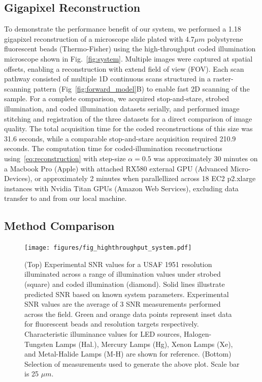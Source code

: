 \subsection{Gigapixel Reconstruction}
To demonstrate the performance benefit of our system, we performed a 1.18 gigapixel reconstruction of a microscope slide plated with 4.7$\mu m$ polystyrene fluorescent beads (Thermo-Fisher) using the high-throughput coded illumination microscope shown in Fig.~\ref{fig:system}. Multiple images were captured at spatial offsets, enabling a reconstruction with extend field of view (FOV). Each scan pathway consisted of multiple 1D continuous scans structured in a raster-scanning pattern (Fig~\ref{fig:forward_model}{B}) to enable fast 2D scanning of the sample. For a complete comparison, we acquired stop-and-stare, strobed illumination, and coded illumination datasets serially, and performed image stitching and registration of the three datasets for a direct comparison of image quality. The total acquisition time for the coded reconstructions of this size was 31.6 seconds, while a comparable stop-and-stare acquisition required 210.9 seconds. The computation time for coded-illumination reconstructions using~\eqref{eq:reconstruction} with step-size $\alpha=0.5$ was approximately 30 minutes on a Macbook Pro (Apple) with attached RX580 external GPU (Advanced Micro-Devices), or approximately 2 minutes when parallellized across 18 EC2 p2.xlarge instances with Nvidia Titan GPUs (Amazon Web Services), excluding data transfer to and from our local machine.

\subsection{Method Comparison}\label{sec:highthroughput:method_comparison}

\begin{figure}
\centering
\texttt{[image: figures/fig\_highthroughput\_system.pdf]}
  \caption{\label{fig:experimental_comparison}(Top) Experimental SNR values for a USAF 1951 resolution illuminated across a range of illumination values under strobed (square) and coded illumination (diamond). Solid lines illustrate predicted SNR based on known system parameters. Experimental SNR values are the average of 3 SNR measurements performed across the field. Green and orange data points represent inset data for fluorescent beads and resolution targets respectively. Characteristic illuminance values for LED sources, Halogen-Tungsten Lamps (Hal.), Mercury Lamps (Hg), Xenon Lamps (Xe), and Metal-Halide Lamps (M-H) are shown for reference. (Bottom) Selection of measurements used to generate the above plot. Scale bar is 25 $\mu m$.}

\end{figure}

